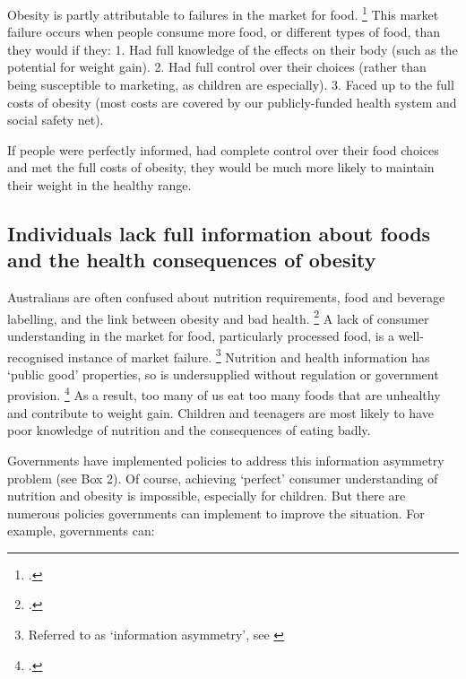 \documentclass[embargoed]{grattan}
\begin{document}
Obesity is partly attributable to failures in the market for food.%
\footcite{Karnani2016ObesityCrisisas} This market failure occurs when people consume more food, or different types of food, than they would if they: 1.
Had full knowledge of the effects on their body (such as the potential for weight gain). 2.
Had full control over their choices (rather than being susceptible to marketing, as children are especially). 3.
Faced up to the full costs of obesity (most costs are covered by our publicly-funded health system and social safety net).

If people were perfectly informed, had complete control over their food choices and met the full costs of obesity, they would be much more likely to maintain their weight in the healthy range.

\subsection{Individuals lack full information about foods and the health consequences of obesity }\label{individuals-lack-full-information-about-foods-and-the-health-consequences-of-obesity}

Australians are often confused about nutrition requirements, food and beverage labelling, and the link between obesity and bad health.%
\footcites{Baker2014Fatnationwhy}{Karnani2016ObesityCrisisas} A lack of consumer understanding in the market for food, particularly processed food, is a well-recognised instance of market failure.%
\footnote{Referred to as `information asymmetry', see \textcites{Karnani2016ObesityCrisisas}{Freebairn2010Taxationobesity}} Nutrition and health information has `public good' properties, so is undersupplied without regulation or government provision.%
\footcite{Freebairn2010Taxationobesity} As a result, too many of us eat too many foods that are unhealthy and contribute to weight gain.
Children and teenagers are most likely to have poor knowledge of nutrition and the consequences of eating badly.

Governments have implemented policies to address this information asymmetry problem (see Box 2).
Of course, achieving `perfect' consumer understanding of nutrition and obesity is impossible, especially for children.
But there are numerous policies governments can implement to improve the situation.
For example, governments can:
\end{document}
